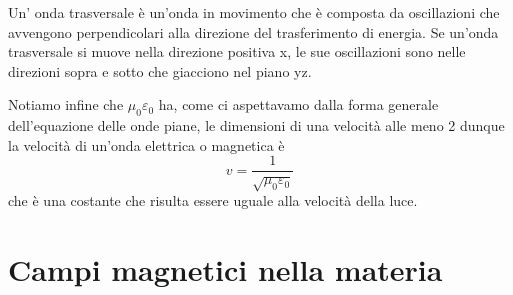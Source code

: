\documentclass[
10pt, %
a4paper, %
oneside, %
headinclude,footinclude, %
BCOR5mm, %
]{scrartcl}
\begin{document}
\begin{definizione}
	Un' onda trasversale è un'onda in movimento che è composta da oscillazioni che avvengono perpendicolari alla direzione del trasferimento di energia. Se un'onda trasversale si muove nella direzione positiva x, le sue oscillazioni sono nelle direzioni sopra e sotto che giacciono nel piano yz.
\end{definizione}
Notiamo infine che $\mu_0\varepsilon_0$ ha, come ci aspettavamo dalla forma generale dell'equazione delle onde piane, le dimensioni di una velocità alle meno 2 dunque la velocità di un'onda elettrica o magnetica è 
\[v = \frac{1}{\sqrt{\mu_0\varepsilon_0}}\]
che è una costante che risulta essere uguale alla velocità della luce. 
\section{Campi magnetici nella materia}
\end{document}
